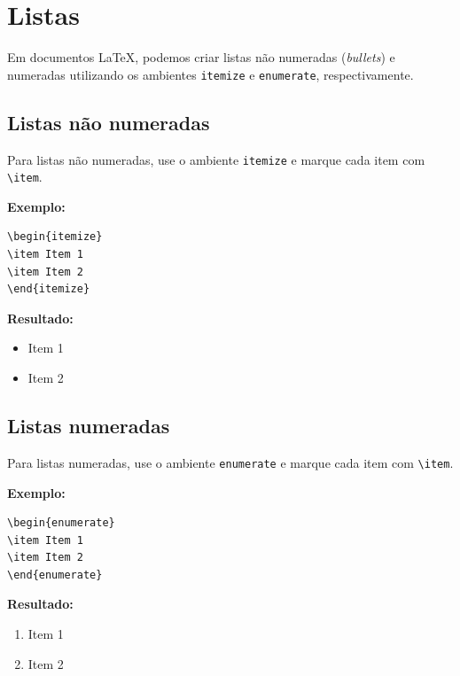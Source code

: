 
\section{Listas}
\label{sec:listas}

Em documentos \LaTeX, podemos criar listas não numeradas (\textit{bullets}) e numeradas utilizando os ambientes \verb|itemize| e \verb|enumerate|, respectivamente.

\subsection{Listas não numeradas}
\label{subsec:listasNaoNumeradas}

Para listas não numeradas, use o ambiente \verb|itemize| e marque cada item com \verb|\item|.

\textbf{Exemplo:}
\begin{verbatim}
\begin{itemize}
\item Item 1
\item Item 2
\end{itemize}
\end{verbatim}

\textbf{Resultado:}
\begin{itemize}
\item Item 1
\item Item 2
\end{itemize}

\subsection{Listas numeradas}
\label{subsec:listasNumeradas}

Para listas numeradas, use o ambiente \verb|enumerate| e marque cada item com \verb|\item|.

\textbf{Exemplo:}
\begin{verbatim}
\begin{enumerate}
\item Item 1
\item Item 2
\end{enumerate}
\end{verbatim}

\textbf{Resultado:}
\begin{enumerate}
\item Item 1
\item Item 2
\end{enumerate}


